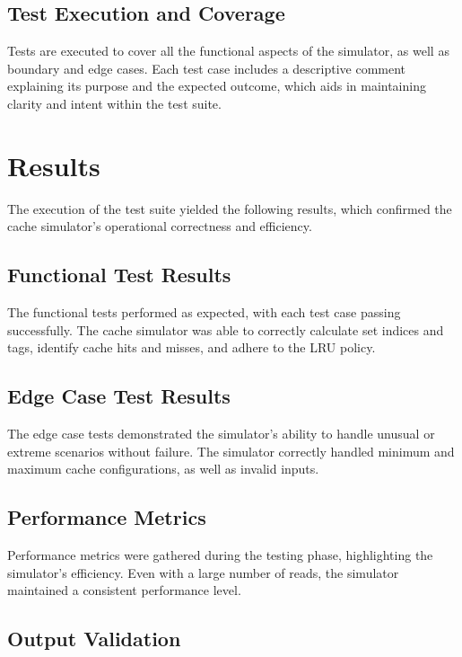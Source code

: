 \documentclass[12pt]{article}
\begin{document}
\subsection{Test Execution and Coverage}

Tests are executed to cover all the functional aspects of the simulator, as well as boundary and edge cases. Each test case includes a descriptive comment explaining its purpose and the expected outcome, which aids in maintaining clarity and intent within the test suite.

\section{Results}

The execution of the test suite yielded the following results, which confirmed the cache simulator's operational correctness and efficiency.

\subsection{Functional Test Results}

The functional tests performed as expected, with each test case passing successfully. The cache simulator was able to correctly calculate set indices and tags, identify cache hits and misses, and adhere to the LRU policy.

\newpage
\vspace*{1cm}
\subsection{Edge Case Test Results}

The edge case tests demonstrated the simulator's ability to handle unusual or extreme scenarios without failure. The simulator correctly handled minimum and maximum cache configurations, as well as invalid inputs.

\subsection{Performance Metrics}

Performance metrics were gathered during the testing phase, highlighting the simulator's efficiency. Even with a large number of reads, the simulator maintained a consistent performance level.

\subsection{Output Validation}
\end{document}
